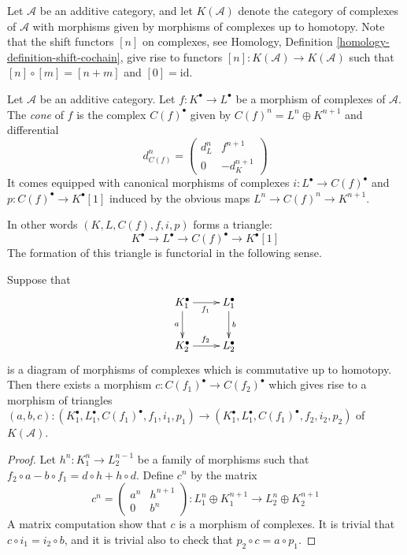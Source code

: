 \noindent
Let $\mathcal{A}$ be an additive category, and let
$K(\mathcal{A})$ denote the category of complexes of
$\mathcal{A}$ with morphisms given by morphisms of
complexes up to homotopy. Note that the shift functors
$[n]$ on complexes, see
Homology, Definition \ref{homology-definition-shift-cochain},
give rise to functors $[n] : K(\mathcal{A}) \to K(\mathcal{A})$
such that $[n] \circ [m] = [n + m]$ and $[0] = \text{id}$.

\begin{definition}
\label{definition-cone}
Let $\mathcal{A}$ be an additive category.
Let $f : K^\bullet \to L^\bullet$ be a morphism of
complexes of $\mathcal{A}$. The {\it cone} of $f$
is the complex $C(f)^\bullet$ given by
$C(f)^n = L^n \oplus K^{n + 1}$ and
differential
$$
d_{C(f)}^n =
\left(
\begin{matrix}
d^n_L & f^{n + 1} \\
0 & -d_K^{n + 1}
\end{matrix}
\right)
$$
It comes equipped with canonical morphisms of complexes
$i : L^\bullet \to C(f)^\bullet$ and $p : C(f)^\bullet \to K^\bullet[1]$
induced by the obvious maps $L^n \to C(f)^n \to K^{n + 1}$.
\end{definition}

\noindent
In other words $(K, L, C(f), f, i, p)$ forms a triangle:
$$
K^\bullet \to L^\bullet \to C(f)^\bullet \to K^\bullet[1]
$$
The formation of this triangle is
functorial in the following sense.

\begin{lemma}
\label{lemma-functorial-cone}
Suppose that
$$
\xymatrix{
K_1^\bullet \ar[r]_{f_1} \ar[d]_a & L_1^\bullet \ar[d]^b \\
K_2^\bullet \ar[r]^{f_2} & L_2^\bullet
}
$$
is a diagram of morphisms of complexes which is commutative
up to homotopy. Then there exists a morphism
$c : C(f_1)^\bullet \to C(f_2)^\bullet$ which gives rise to
a morphism of triangles
$(a, b, c) : (K_1^\bullet, L_1^\bullet, C(f_1)^\bullet, f_1, i_1, p_1)
\to
(K_1^\bullet, L_1^\bullet, C(f_1)^\bullet, f_2, i_2, p_2)$
of $K(\mathcal{A})$.
\end{lemma}

\begin{proof}
Let $h^n : K_1^n \to L_2^{n - 1}$ be a family of morphisms such that
$f_2 \circ a - b \circ f_1 = d \circ h + h \circ d$.
Define $c^n$ by the matrix
$$
c^n =
\left(
\begin{matrix}
a^n & h^{n + 1} \\
0 & b^n
\end{matrix}
\right) :
L_1^n \oplus K_1^{n + 1} \to L_2^n \oplus K_2^{n + 1}
$$
A matrix computation show that $c$ is a morphism of complexes.
It is trivial that $c \circ i_1 = i_2 \circ b$, and it is
trivial also to check that $p_2 \circ c = a \circ p_1$.
\end{proof}

